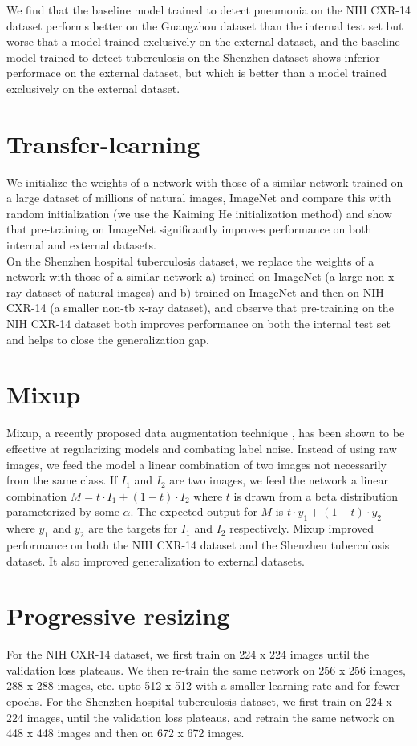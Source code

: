 \documentclass[oneside,a4paper]{article}
\begin{document}
We find that the baseline model trained to detect pneumonia on the NIH CXR-14
dataset performs better on the Guangzhou dataset than the internal test set but
worse that a model trained exclusively on the external dataset, and the baseline
model trained to detect tuberculosis on the Shenzhen dataset shows inferior
performace on the external dataset, but which is better than a model trained
exclusively on the external dataset.

\section{Transfer-learning}
We initialize the weights of a network with those of a similar network trained
on a large dataset of millions of natural images, ImageNet and compare this with random initialization (we use the Kaiming He initialization method\cite{he2015delving}) and show that pre-training on ImageNet significantly improves performance on
both internal and external datasets.\\

On the Shenzhen hospital tuberculosis dataset, we replace the weights
of a network with those of a similar network a) trained on ImageNet (a large
non-x-ray dataset of natural images) and b) trained on ImageNet and then on NIH
CXR-14 (a smaller non-tb x-ray
dataset), and observe that pre-training on the NIH CXR-14 dataset both improves performance
on both the internal test set and helps to close the generalization gap.

\section{Mixup}
Mixup, a recently proposed data augmentation technique \cite{Zhang2017}, has been shown to be effective at regularizing models and combating label
noise. Instead of using raw
images, we feed the model a linear combination of two images not necessarily
from the same class. If $I_1$ and $I_2$ are two images, we feed the network a
linear combination $M = t \cdot{}I_1 + (1 - t) \cdot{}I_2$ where $t$ is drawn
from a beta distribution parameterized by some $\alpha$. The expected output for
$M$ is $ t \cdot{} y_1 + (1 - t) \cdot{} y_2$ where $y_1$ and $y_2$ are the
targets for $I_1$
and $I_2$ respectively. Mixup improved performance on both the NIH CXR-14 dataset and the Shenzhen
tuberculosis dataset. It also improved generalization to external datasets.


\section{Progressive resizing}
For the NIH CXR-14 dataset, we first train on 224 x 224 images until the
validation loss plateaus. We then re-train the same network on 256 x 256 images,
288 x 288 images, etc. upto 512 x 512 with a smaller learning rate and for
fewer epochs. For the Shenzhen hospital tuberculosis dataset, we first train on 224 x 224
images, until the validation loss plateaus, and retrain the same network on 448
x 448 images and then on 672 x 672 images.\\
\end{document}
